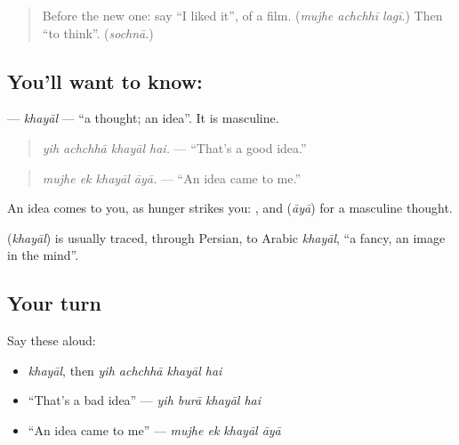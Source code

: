 \label{lesson:UR-C268-khayal}



\begin{quote}
Before the new one: say \textquotedblleft{}I liked it\textquotedblright{}, of a film. (\emph{mujhe achchhī lagī}.) Then \textquotedblleft{}to think\textquotedblright{}. (\emph{sochnā}.)
\end{quote}

\subsection*{You'll want to know: }
\textbf{} — \emph{khayāl} — \textquotedblleft{}a thought; an idea\textquotedblright{}. It is masculine.

\begin{quote}
\textbf{   }
\end{quote}

\begin{quote}
\emph{yih achchhā khayāl hai.} — \textquotedblleft{}That's a good idea.\textquotedblright{}
\end{quote}

\begin{quote}
\textbf{   }
\end{quote}

\begin{quote}
\emph{mujhe ek khayāl āyā.} — \textquotedblleft{}An idea came to me.\textquotedblright{}
\end{quote}

An idea comes to you, as hunger strikes you: \textbf{}, and \textbf{} (\emph{āyā}) for a masculine thought.

\begin{cousinweb}
\textbf{} (\emph{khayāl}) is usually traced, through Persian, to Arabic \emph{khayāl}, \textquotedblleft{}a fancy, an image in the mind\textquotedblright{}.
\end{cousinweb}

\subsection*{Your turn}
Say these aloud:

\begin{itemize}
\raggedright
  \item \emph{khayāl}, then \emph{yih achchhā khayāl hai}
  \item \textquotedblleft{}That's a bad idea\textquotedblright{} — \emph{yih burā khayāl hai}
  \item \textquotedblleft{}An idea came to me\textquotedblright{} — \emph{mujhe ek khayāl āyā}
\end{itemize}


